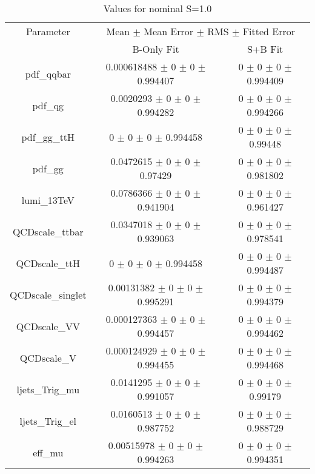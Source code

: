 \begin{table}
\centering
\caption{Values for nominal S=1.0}
\begin{tabular}{ccc}
\toprule
Parameter 	& \multicolumn{2}{c}{Mean $\pm$ Mean Error $\pm$ RMS $\pm$ Fitted Error}\\
 	& B-Only Fit & S+B Fit\\
\midrule
pdf\_qqbar 	& \num{0.000618488} $\pm$ \num{0} $\pm$ \num{0} $\pm$ \num{0.994407} 	& \num{0} $\pm$ \num{0} $\pm$ \num{0} $\pm$ \num{0.994409}\\
pdf\_qg 	& \num{0.0020293} $\pm$ \num{0} $\pm$ \num{0} $\pm$ \num{0.994282} 	& \num{0} $\pm$ \num{0} $\pm$ \num{0} $\pm$ \num{0.994266}\\
pdf\_gg\_ttH 	& \num{0} $\pm$ \num{0} $\pm$ \num{0} $\pm$ \num{0.994458} 	& \num{0} $\pm$ \num{0} $\pm$ \num{0} $\pm$ \num{0.99448}\\
pdf\_gg 	& \num{0.0472615} $\pm$ \num{0} $\pm$ \num{0} $\pm$ \num{0.97429} 	& \num{0} $\pm$ \num{0} $\pm$ \num{0} $\pm$ \num{0.981802}\\
lumi\_13TeV 	& \num{0.0786366} $\pm$ \num{0} $\pm$ \num{0} $\pm$ \num{0.941904} 	& \num{0} $\pm$ \num{0} $\pm$ \num{0} $\pm$ \num{0.961427}\\
QCDscale\_ttbar 	& \num{0.0347018} $\pm$ \num{0} $\pm$ \num{0} $\pm$ \num{0.939063} 	& \num{0} $\pm$ \num{0} $\pm$ \num{0} $\pm$ \num{0.978541}\\
QCDscale\_ttH 	& \num{0} $\pm$ \num{0} $\pm$ \num{0} $\pm$ \num{0.994458} 	& \num{0} $\pm$ \num{0} $\pm$ \num{0} $\pm$ \num{0.994487}\\
QCDscale\_singlet 	& \num{0.00131382} $\pm$ \num{0} $\pm$ \num{0} $\pm$ \num{0.995291} 	& \num{0} $\pm$ \num{0} $\pm$ \num{0} $\pm$ \num{0.994379}\\
QCDscale\_VV 	& \num{0.000127363} $\pm$ \num{0} $\pm$ \num{0} $\pm$ \num{0.994457} 	& \num{0} $\pm$ \num{0} $\pm$ \num{0} $\pm$ \num{0.994462}\\
QCDscale\_V 	& \num{0.000124929} $\pm$ \num{0} $\pm$ \num{0} $\pm$ \num{0.994455} 	& \num{0} $\pm$ \num{0} $\pm$ \num{0} $\pm$ \num{0.994468}\\
ljets\_Trig\_mu 	& \num{0.0141295} $\pm$ \num{0} $\pm$ \num{0} $\pm$ \num{0.991057} 	& \num{0} $\pm$ \num{0} $\pm$ \num{0} $\pm$ \num{0.99179}\\
ljets\_Trig\_el 	& \num{0.0160513} $\pm$ \num{0} $\pm$ \num{0} $\pm$ \num{0.987752} 	& \num{0} $\pm$ \num{0} $\pm$ \num{0} $\pm$ \num{0.988729}\\
eff\_mu 	& \num{0.00515978} $\pm$ \num{0} $\pm$ \num{0} $\pm$ \num{0.994263} 	& \num{0} $\pm$ \num{0} $\pm$ \num{0} $\pm$ \num{0.994351}\\

\end{tabular}
\end{table}
